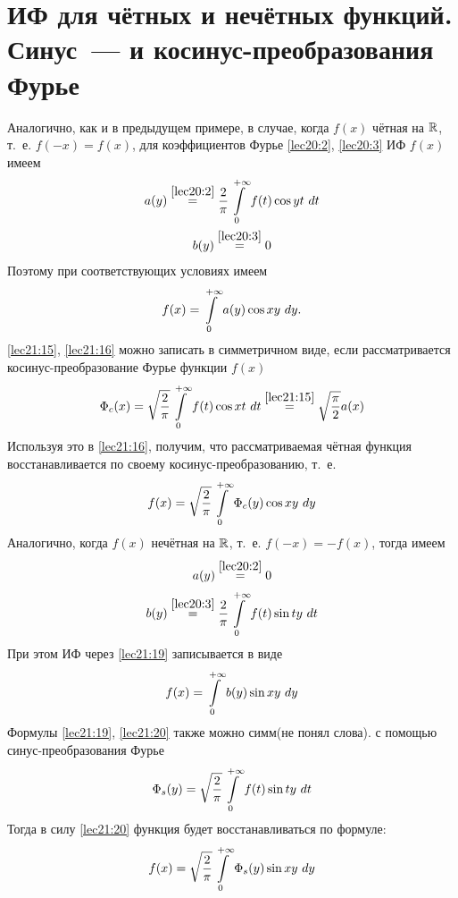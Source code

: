 \documentclass[../../main.tex]{subfiles}
\begin{document}
\section{ИФ для чётных и нечётных функций. Синус~--- и косинус-преобразования 
Фурье}

Аналогично, как и в предыдущем примере, в случае, 
когда $ f(x) $ чётная на $ \mathbb{R} $, т.~е. $ f(-x) = f(x) $, для коэффициентов 
Фурье
\eqref{lec20:2}, \eqref{lec20:3} ИФ $ f(x) $ имеем 
\begin{equation}
\label{lec21:15}
\begin{gathered}
a(y) \stackrel{\eqref{lec20:2}}{=}
\dfrac{2}{\pi} \int\limits_{0}^{+\infty} f(t) \cos yt\ dt\\
b(y) \stackrel{\eqref{lec20:3}}{=} 0
\end{gathered}
\end{equation}
Поэтому при соответствующих условиях имеем 
\begin{equation}
\label{lec21:16}
f(x) = \int\limits_{0}^{+\infty} a(y) \cos xy\ dy.
\end{equation}
\eqref{lec21:15}, \eqref{lec21:16} можно записать в симметричном виде, если 
рассматривается косинус-преобразование Фурье функции $ f(x) $
\[
\Phi_c(x) = \sqrt{\dfrac{2}{\pi}} \int\limits_{0}^{+\infty} f(t) \cos xt\ dt
\stackrel{\eqref{lec21:15}}{=} \sqrt{\dfrac{\pi}{2}}a(x)
\]
Используя это в \eqref{lec21:16}, получим, что рассматриваемая
чётная функция восстанавливается по своему косинус-преобразованию, т.~е.
\[
f(x) = \sqrt{\dfrac{2}{\pi}} \int\limits_{0}^{+\infty} \Phi_c(y) \cos xy\ dy
\]
Аналогично, когда $ f(x) $ нечётная на $ \mathbb{R} $, т.~е.
$ f(-x) = -f(x) $, тогда имеем 
\begin{equation}
\label{lec21:18}
a(y) \stackrel{\eqref{lec20:2}}{=} 0
\end{equation}
\begin{equation}
\label{lec21:19}
b(y) \stackrel{\eqref{lec20:3}}{=}
\dfrac{2}{\pi}
\int\limits_{0}^{+\infty} f(t) \sin ty\ dt
\end{equation}
При этом ИФ через \eqref{lec21:19} записывается в виде
\begin{equation}
\label{lec21:20}
f(x) = \int\limits_{0}^{+\infty} b(y) \sin xy\ dy
\end{equation}
Формулы \eqref{lec21:19}, \eqref{lec21:20} также можно симм(не понял слова). с 
помощью синус-преобразования Фурье
\begin{equation}
\label{lec21:21}
\Phi_s(y) = \sqrt{\dfrac{2}{\pi}} \int\limits_{0}^{+\infty}
f(t) \sin ty\ dt
\end{equation}
Тогда в силу \eqref{lec21:20} функция будет восстанавливаться по формуле:
\begin{equation}
\label{lec21:22}
f(x) = \sqrt{\dfrac{2}{\pi}} \int\limits_{0}^{+\infty} \Phi_s(y) \sin xy\ dy
\end{equation}
\end{document}
